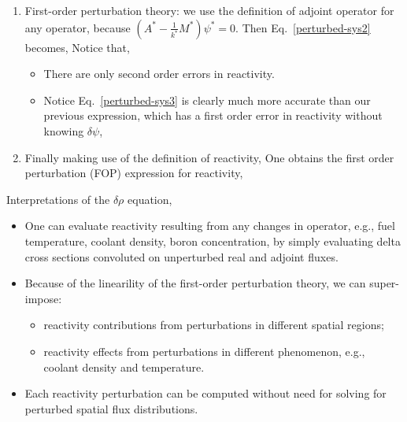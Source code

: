 \documentclass{school-22.211-notes}
\begin{document}
\begin{enumerate}
\item First-order perturbation theory: we use the definition of adjoint operator for any operator, 
because $\left( A^* - \frac{1}{k^*} M^* \right) \psi^* = 0$. Then Eq.~\ref{perturbed-sys2} becomes, 
Notice that, 
\begin{itemize}
 \item There are only second order errors in reactivity. 
 \item Notice Eq.~\ref{perturbed-sys3} is clearly much more accurate than our previous expression, which has a first order error in reactivity without knowing $\delta \psi$, 
\end{itemize}

 \item Finally making use of the definition of reactivity, 
   One obtains the first order perturbation (FOP) expression for reactivity, 
\end{enumerate}
Interpretations of the $\delta \rho$ equation, 
\begin{itemize}
\item One can evaluate reactivity resulting from any changes in operator, e.g., fuel temperature, coolant density, boron concentration, by simply evaluating delta cross sections convoluted on unperturbed real and adjoint fluxes. 

\item Because of the linearility of the first-order perturbation theory, we can super-impose: 
  \begin{itemize}
  \item reactivity contributions from perturbations in different spatial regions;
  \item reactivity effects from perturbations in different phenomenon, e.g., coolant density and temperature. 
  \end{itemize}

\item Each reactivity perturbation can be computed without need for solving for perturbed spatial flux distributions. 
\end{itemize}
\end{document}
